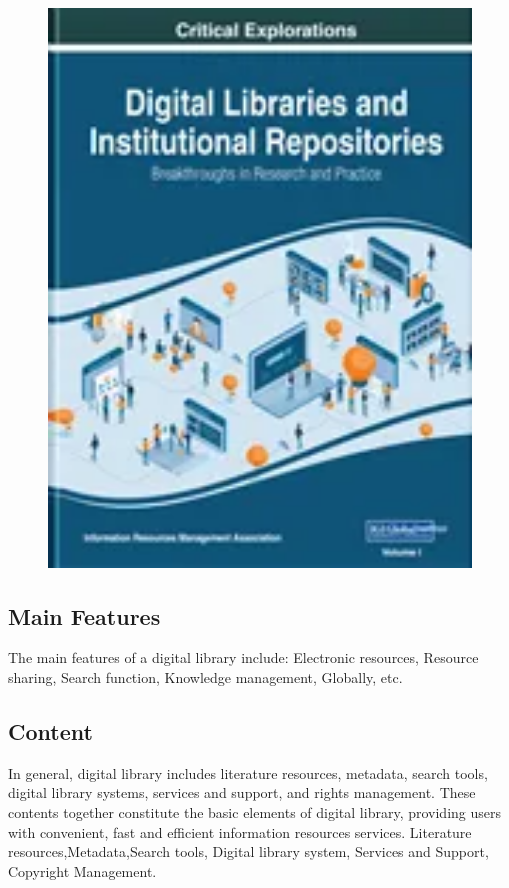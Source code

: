 \begin{figure}[htbp]
  \centerline{\includegraphics[width=500pt]{images/1-2-3.jpg}}
\end{figure}

\subsection{Main Features}
The main features of a digital library include:
Electronic resources, Resource sharing, Search function, Knowledge management, Globally, etc.

\subsection{Content}
In general, digital library includes literature resources, metadata, search tools, digital library systems, services and support, and rights management. These contents together constitute the basic elements of digital library, providing users with convenient, fast and efficient information resources services.
Literature resources,Metadata,Search tools, Digital library system, Services and Support, Copyright Management.

